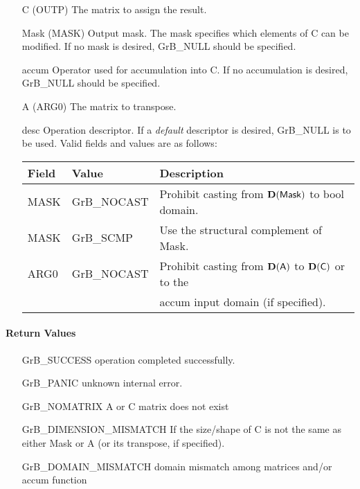 \begin{itemize}[leftmargin=1.1in]
    \item[{\sf C}]   ({\sf OUTP}) The matrix to assign the result.

    \item[{\sf Mask}]  ({\sf MASK}) Output mask. The mask specifies which elements
    of {\sf C} can be modified. If no mask is desired, {\sf GrB\_NULL} should be specified.

    \item[{\sf accum}] Operator used for accumulation into {\sf C}.  If no accumulation
                        is desired, {\sf GrB\_NULL} should be specified.

    \item[{\sf A}]   ({\sf ARG0}) The matrix to transpose.

    \item[{\sf desc}]   Operation descriptor. If a
    \emph{default} descriptor is desired, {\sf GrB\_NULL} is to be
    used.  Valid fields and values are as follows: \\
    \begin{tabular}{lll}
    Field  & Value & Description \\
    \hline
    {\sf MASK} & {\sf GrB\_NOCAST} & Prohibit casting from $\bold{D}({\sf Mask})$ to {\sf bool} domain. \\
    {\sf MASK} & {\sf GrB\_SCMP}   & Use the structural complement of {\sf Mask}. \\
    {\sf ARG0} & {\sf GrB\_NOCAST} & Prohibit casting from $\bold{D}({\sf A})$ to $\bold{D}({\sf C})$ or to the \\ & & accum input domain (if specified). \\
    \end{tabular}
\end{itemize}

\paragraph{Return Values}

\begin{itemize}[leftmargin=2.1in]
\item[{\sf GrB\_SUCCESS}]     operation completed successfully.
\item[{\sf GrB\_PANIC}]        unknown internal error.
\item[{\sf GrB\_NOMATRIX}]   {\sf A} or {\sf C} matrix does not exist
\item[{\sf GrB\_DIMENSION\_MISMATCH}]      
        If the size/shape of {\sf C} is not the same as either {\sf Mask} or {\sf A} (or its transpose, if specified).
\item[{\sf GrB\_DOMAIN\_MISMATCH}]  
        domain mismatch among matrices and/or
        accum function 
\end{itemize}

